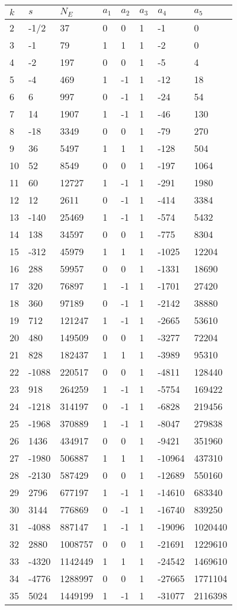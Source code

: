 \documentclass{amsart}
\begin{document}
\begin{longtable}{|l|l|l|lllll|}
\hline
$k$ & $s$ & $N_E$ & $a_1$ & $a_2$ & $a_3$ & $a_4$ & $a_5$\\
\hline
2&-1/2&37&0&0&1&-1&0\\
3&-1&79&1&1&1&-2&0\\
4&-2&197&0&0&1&-5&4\\
5&-4&469&1&-1&1&-12&18\\
6&6&997&0&-1&1&-24&54\\
7&14&1907&1&-1&1&-46&130\\
8&-18&3349&0&0&1&-79&270\\
9&36&5497&1&1&1&-128&504\\
10&52&8549&0&0&1&-197&1064\\
11&60&12727&1&-1&1&-291&1980\\
12&12&2611&0&-1&1&-414&3384\\
13&-140&25469&1&-1&1&-574&5432\\
14&138&34597&0&0&1&-775&8304\\
15&-312&45979&1&1&1&-1025&12204\\
16&288&59957&0&0&1&-1331&18690\\
17&320&76897&1&-1&1&-1701&27420\\
18&360&97189&0&-1&1&-2142&38880\\
19&712&121247&1&-1&1&-2665&53610\\
20&480&149509&0&0&1&-3277&72204\\
21&828&182437&1&1&1&-3989&95310\\
22&-1088&220517&0&0&1&-4811&128440\\
23&918&264259&1&-1&1&-5754&169422\\
24&-1218&314197&0&-1&1&-6828&219456\\
25&-1968&370889&1&-1&1&-8047&279838\\
26&1436&434917&0&0&1&-9421&351960\\
27&-1980&506887&1&1&1&-10964&437310\\
28&-2130&587429&0&0&1&-12689&550160\\
29&2796&677197&1&-1&1&-14610&683340\\
30&3144&776869&0&-1&1&-16740&839250\\
31&-4088&887147&1&-1&1&-19096&1020440\\
32&2880&1008757&0&0&1&-21691&1229610\\
33&-4320&1142449&1&1&1&-24542&1469610\\
34&-4776&1288997&0&0&1&-27665&1771104\\
35&5024&1449199&1&-1&1&-31077&2116398\\

\end{longtable}
\end{document}
